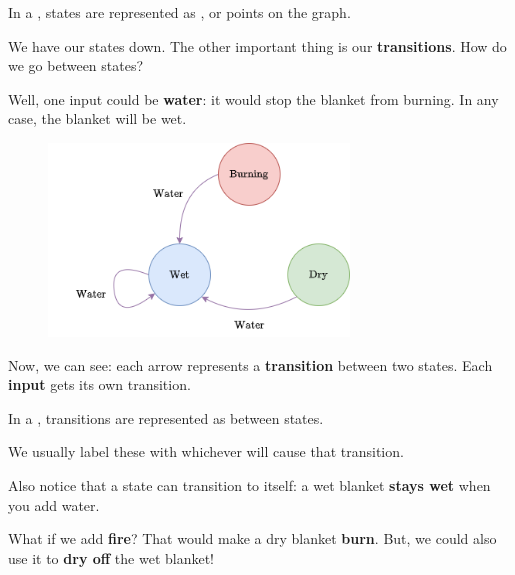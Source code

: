             \begin{concept}
                In a , states are represented as , or points on the graph.
            \end{concept}
            
            We have our states down. The other important thing is our \textbf{transitions}. How do we go between states?
            
            Well, one input could be \textbf{water}: it would stop the blanket from burning. In any case, the blanket will be wet.
            
            \begin{figure}[H]
                \centering
                \includegraphics[width=80mm,scale=0.4]{images/rnn_images/std_water.png}
            \end{figure}
            
            Now, we can see: each arrow represents a \textbf{transition} between two states. Each \textbf{input} gets its own transition.\\
            
            \begin{concept}
                In a , transitions are represented as  between states.
                
                We usually label these with whichever  will cause that transition.
            \end{concept}
            
            Also notice that a state can transition to itself: a wet blanket \textbf{stays wet} when you add water.
            
            What if we add \textbf{fire}? That would make a dry blanket \textbf{burn}. But, we could also use it to \textbf{dry off} the wet blanket!
            
